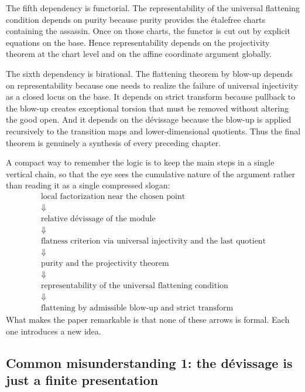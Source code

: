 \documentclass[11pt,oneside]{article}
\newcommand{\etale}{\'etale}
\begin{document}
The fifth dependency is functorial.  The representability of the universal flattening condition depends on purity because purity provides the \etale free charts containing the assassin.  Once on those charts, the functor is cut out by explicit equations on the base.  Hence representability depends on the projectivity theorem at the chart level and on the affine coordinate argument globally.

The sixth dependency is birational.  The flattening theorem by blow-up depends on representability because one needs to realize the failure of universal injectivity as a closed locus on the base.  It depends on strict transform because pullback to the blow-up creates exceptional torsion that must be removed without altering the good open.  And it depends on the d\'evissage because the blow-up is applied recursively to the transition maps and lower-dimensional quotients.  Thus the final theorem is genuinely a synthesis of every preceding chapter.

A compact way to remember the logic is to keep the main steps in a single vertical chain, so that the eye sees the cumulative nature of the argument rather than reading it as a single compressed slogan:
\[
\renewcommand{\arraystretch}{1.5}
\begin{array}{c}
\text{local factorization near the chosen point}\\
\Downarrow\\
\text{relative d\'evissage of the module}\\
\Downarrow\\
\text{flatness criterion via universal injectivity and the last quotient}\\
\Downarrow\\
\text{purity and the projectivity theorem}\\
\Downarrow\\
\text{representability of the universal flattening condition}\\
\Downarrow\\
\text{flattening by admissible blow-up and strict transform}
\end{array}
\]
What makes the paper remarkable is that none of these arrows is formal.  Each one introduces a new idea.

\subsection*{Common misunderstanding 1: the d\'evissage is just a finite presentation}
\end{document}
